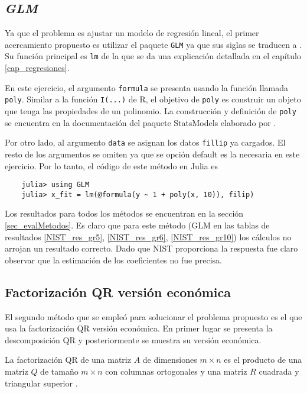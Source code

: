 \subsection{\textit{GLM}}

Ya que el problema es ajustar un modelo de regresión lineal, el primer acercamiento propuesto es utilizar el paquete \texttt{GLM} ya que sus siglas se traducen a . Su función principal es \texttt{lm} de la que se da una explicación detallada en el capítulo \ref{cap_regresiones}. 

En este ejercicio, el argumento \texttt{formula} se presenta usando la función llamada \texttt{poly}. Similar a la función \texttt{I(...)} de \textsf{R}, el objetivo de \texttt{poly} es construir un objeto que tenga las propiedades de un polinomio. La construcción y definición  de \texttt{poly} se encuentra en la documentación del paquete \textsf{StatsModels} elaborado por \cite{StatsModel_manual}. 

Por otro lado, al argumento \texttt{data} se asignan los datos \texttt{fillip} ya cargados. El resto de los argumentos se omiten ya que se opción default es la necesaria en este ejercicio. Por lo tanto, el código de este método en \textsf{Julia} es 


\begin{verbatim}
    julia> using GLM
    julia> x_fit = lm(@formula(y ~ 1 + poly(x, 10)), filip)
\end{verbatim}


Los resultados para todos los métodos se encuentran en la sección \ref{sec_evalMetodos}. Es claro que para este método (GLM en las tablas de resultados \ref{NIST_res_gr5}, \ref{NIST_res_gr6}, \ref{NIST_res_gr10}) los cálculos no arrojan un resultado correcto. Dado que NIST proporciona la respuesta fue claro observar que la estimación de los coeficientes no fue precisa.


\subsection{Factorización QR versión económica}

El segundo método que se empleó para solucionar el problema propuesto es el que usa la factorización QR versión económica. En primer lugar se presenta la descomposición QR y posteriormente se muestra su versión económica.

\begin{definition}
La factorización QR de una matriz $A$ de dimensiones $m \times n$ es el producto de una matriz $Q$ de tamaño $m \times n$ con columnas ortogonales y una matriz $R$ cuadrada y triangular superior \cite[p.~191]{garcia2017second}. 
\end{definition}

